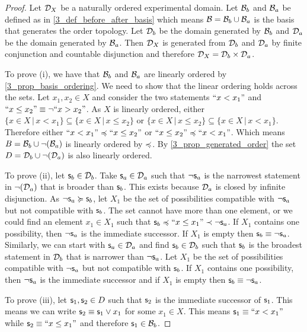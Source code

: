 \documentclass[11pt,letterpaper,fleqn]{memoir} %
\begin{document}
\begin{mathSection}
\begin{proof}
	Let $\mathcal{D}_X$ be a naturally ordered experimental domain. Let $\mathcal{B}_b$ and $\mathcal{B}_a$ be defined as in \ref{3_def_before_after_basis} which means $\mathcal{B} = \mathcal{B}_b \cup \mathcal{B}_a$ is the basis that generates the order topology. Let $\mathcal{D}_b$ be the domain generated by $\mathcal{B}_b$ and $\mathcal{D}_a$ be the domain generated by $\mathcal{B}_a$. Then $\mathcal{D}_X$ is generated from $\mathcal{D}_b$ and $\mathcal{D}_a$ by finite conjunction and countable disjunction and therefore $\mathcal{D}_X = \mathcal{D}_b \times \mathcal{D}_a$.
	
	To prove (i), we have that $\mathcal{B}_b$ and $\mathcal{B}_a$ are linearly ordered by \ref{3_prop_basis_ordering}. We need to show that the linear ordering holds across the sets. Let $x_1, x_2 \in X$ and consider the two statements $``x < x_1"$ and $``x \leq x_2"\equiv \neg ``x > x_2"$. As $X$ is linearly ordered, either $\{x \in X \, | \, x < x_1\} \subseteq \{x \in X \, | \, x \leq x_2\}$ or $\{x \in X \, | \, x \leq x_2\} \subseteq \{x \in X \, | \, x < x_1\}$. Therefore either $``x < x_1" \preccurlyeq ``x \leq x_2"$ or $``x \leq x_2" \preccurlyeq ``x < x_1"$. Which means $B = \mathcal{B}_b \cup \neg(\mathcal{B}_a)$ is linearly ordered by $\preccurlyeq$. By \ref{3_prop_generated_order} the set $D = \mathcal{D}_b \cup \neg(\mathcal{D}_a)$ is also linearly ordered.

	To prove (ii), let $\mathsf{s}_b \in \mathcal{D}_b$. Take $\mathsf{s}_a \in \mathcal{D}_a$ such that $\neg \mathsf{s}_a$ is the narrowest statement in $\neg (\mathcal{D}_a)$ that is broader than $\mathsf{s}_b$. This exists because $\mathcal{D}_a$ is closed by infinite disjunction. As $\neg \mathsf{s}_a \succcurlyeq \mathsf{s}_b$, let $X_1$ be the set of possibilities compatible with $\neg \mathsf{s}_a$ but not compatible with $\mathsf{s}_b$. The set cannot have more than one element, or we could find an element $x_1 \in X_1$ such that $\mathsf{s}_b \preccurlyeq ``x \leq x_1" \prec \neg \mathsf{s}_a$. If $X_1$ contains one possibility, then $\neg \mathsf{s}_a$ is the immediate successor. If $X_1$ is empty then $\mathsf{s}_b \equiv \neg \mathsf{s}_a$. Similarly, we can start with $\mathsf{s}_a \in \mathcal{D}_a$ and find $\mathsf{s}_b \in \mathcal{D}_b$ such that $\mathsf{s}_b$ is the broadest statement in $\mathcal{D}_b$ that is narrower than $\neg \mathsf{s}_a$. Let $X_1$ be the set of possibilities compatible with $\neg \mathsf{s}_a$ but not compatible with $\mathsf{s}_b$. If $X_1$ contains one possibility, then $\neg \mathsf{s}_a$ is the immediate successor and if $X_1$ is empty then $\mathsf{s}_b \equiv \neg \mathsf{s}_a$.
	
	To prove (iii), let $\mathsf{s}_1, \mathsf{s}_2 \in D$ such that $\mathsf{s}_2$ is the immediate successor of $\mathsf{s}_1$. This means we can write $\mathsf{s}_2 \equiv \mathsf{s}_1 \vee x_1$ for some $x_1 \in X$. This means $\mathsf{s}_1 \equiv ``x < x_1"$ while $\mathsf{s}_2 \equiv ``x \leq x_1"$ and therefore $\mathsf{s}_1 \in \mathcal{B}_b$.
	

\end{proof}
\end{mathSection}
\end{document}
